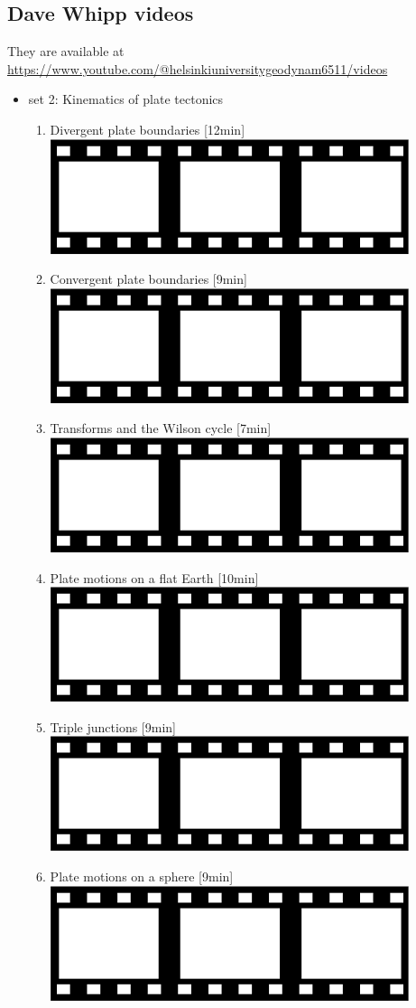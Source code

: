 \subsection{Dave Whipp videos}

They are available at \url{https://www.youtube.com/@helsinkiuniversitygeodynam6511/videos}
\begin{itemize}

\item set 2: Kinematics of plate tectonics
\begin{enumerate}
\item Divergent plate boundaries [12min] \href{https://youtu.be/x3OKt5Warr4?si=YJP5GuxXPTh6SLlo}{\includegraphics[width=.8cm]{images/pictograms/film.png}}
\item Convergent plate boundaries [9min] \href{https://youtu.be/8B4PC-75a1c?si=V5huZbOi1CAxGgxG}{\includegraphics[width=.8cm]{images/pictograms/film.png}}
\item Transforms and the Wilson cycle [7min] \href{https://youtu.be/cLsFLEcfPBY?si=t5St5urowPPwXLdq}{\includegraphics[width=.8cm]{images/pictograms/film.png}}
\item Plate motions on a flat Earth [10min] \href{https://youtu.be/lZMPACABF_E?si=9l1Z-OC9ZwMqn0tv}{\includegraphics[width=.8cm]{images/pictograms/film.png}}
\item Triple junctions [9min] \href{https://youtu.be/SG2X9t0J1fc?si=Qc8JMy3LzoDDzZpL}{\includegraphics[width=.8cm]{images/pictograms/film.png}}
\item Plate motions on a sphere [9min] \href{https://youtu.be/Fifg4O0fs2E?si=LB6NoWUioEEa9XZB}{\includegraphics[width=.8cm]{images/pictograms/film.png}}
\end{enumerate}


\end{itemize}
